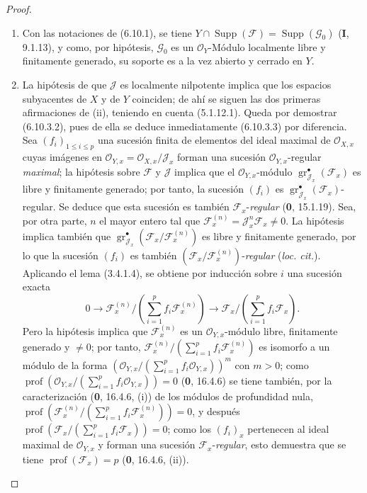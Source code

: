 \begin{proof}
\begin{enumerate}
\item[(i)] Con las notaciones de (6.10.1), se tiene
$Y\cap\operatorname{Supp}(\mathcal F)=\operatorname{Supp}(\mathcal G_0)$
(\textbf I, 9.1.13), y como, por hipótesis, $\mathcal G_0$ es un
$\mathcal O_Y$-Módulo localmente libre y finitamente generado, su soporte es a la vez
abierto y cerrado en $Y$.


\item[(ii)] La hipótesis de que $\mathcal J$ es localmente nilpotente implica que
los espacios subyacentes de $X$ y de $Y$ coinciden; de ahí se siguen las dos primeras
afirmaciones de (ii), teniendo en cuenta (5.1.12.1). Queda por demostrar (6.10.3.2),
pues de ella se deduce inmediatamente (6.10.3.3) por diferencia. Sea
$(f_i)_{1\leq i\leq p}$ una sucesión finita de elementos del ideal maximal de
$\mathcal O_{X,x}$ cuyas imágenes en
$\mathcal O_{Y,x}=\mathcal O_{X,x}/\mathcal J_x$ forman una sucesión
$\mathcal O_{Y,x}$-regular \emph{maximal}; la hipótesis sobre $\mathcal F$ y
$\mathcal J$ implica que el $\mathcal O_{Y,x}$-módulo
$\operatorname{gr}_{\mathcal J_x}^{\bullet}(\mathcal F_x)$ es libre y finitamente
generado; por tanto, la sucesión $(f_i)$ es
$\operatorname{gr}_{\mathcal J_x}^{\bullet}(\mathcal F_x)$-regular. Se
deduce que esta sucesión es también $\mathcal F_x$-\emph{regular} (\textbf 0, 15.1.19). Sea,
por otra parte, $n$ el mayor entero tal que
$\mathcal F_x^{(n)}=\mathcal J_x^n\mathcal F_x\ne0$. La hipótesis implica
también que
$\operatorname{gr}_{\mathcal J_x}^{\bullet}
(\mathcal F_x/\mathcal F_x^{(n)})$ es libre y finitamente generado, por lo que la sucesión
$(f_i)$ es también $(\mathcal F_x/\mathcal F_x^{(n)})$-\emph{regular}
(\emph{loc. cit.}). Aplicando el lema (3.4.1.4), se obtiene por inducción
sobre $i$ una sucesión exacta
\[
0\longrightarrow
\mathcal F_x^{(n)}/\left(\sum_{i=1}^{p}f_i\mathcal F_x^{(n)}\right)
\longrightarrow
\mathcal F_x/\left(\sum_{i=1}^{p}f_i\mathcal F_x\right).
\]
Pero la hipótesis implica que $\mathcal F_x^{(n)}$ es un
$\mathcal O_{Y,x}$-módulo libre, finitamente generado y $\ne0$; por tanto,
$\mathcal F_x^{(n)}/(\sum_{i=1}^{p}f_i\mathcal F_x^{(n)})$ es isomorfo a
un módulo de la forma
$(\mathcal O_{Y,x}/(\sum_{i=1}^{p}f_i\mathcal O_{Y,x}))^m$ con $m>0$; como
$\operatorname{prof}(\mathcal O_{Y,x}/(\sum_{i=1}^{p}f_i\mathcal O_{Y,x}))=0$
(\textbf 0, 16.4.6) se tiene también, por la caracterización (\textbf 0, 16.4.6, (i)) de los módulos
de profundidad nula,
$\operatorname{prof}(\mathcal F_x^{(n)}/(\sum_{i=1}^{p}f_i\mathcal F_x^{(n)}))=0$,
y después
$\operatorname{prof}(\mathcal F_x/(\sum_{i=1}^{p}f_i\mathcal F_x))=0$;
como los $(f_i)_x$ pertenecen al ideal maximal de $\mathcal O_{Y,x}$ y forman
una sucesión $\mathcal F_x$-\emph{regular}, esto demuestra que se tiene
$\operatorname{prof}(\mathcal F_x)=p$ (\textbf 0, 16.4.6, (ii)).
\end{enumerate}
\end{proof}

